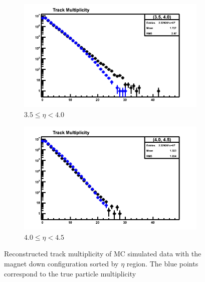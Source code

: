 \begin{figure}[h]
\begin{subfigure}[h]{0.32\textwidth}
		\includegraphics[width=\textwidth]{./Chapters/multiplicity/images/reconstructed_multiplicity_3_5_4_0_mc_down.png}
		\caption{$3.5 \le \eta < 4.0$}
		\label{fig: reconstructed track multiplicity mc down 3.5 - 4.0}
	\end{subfigure}
	\begin{subfigure}[h]{0.32\textwidth}
		\includegraphics[width=\textwidth]{./Chapters/multiplicity/images/reconstructed_multiplicity_4_0_4_5_mc_down.png}
		\caption{$4.0 \le \eta < 4.5$}
		\label{fig: reconstructed track multiplicity mc down 4.0 - 4.5}
	\end{subfigure}
	\caption{Reconstructed track multiplicity of MC simulated data with the magnet down configuration sorted by $\eta$ region. The blue points correspond to the true particle multiplicity}
	\label{fig: reconstructed track multiplicity mc down}
\end{figure}

